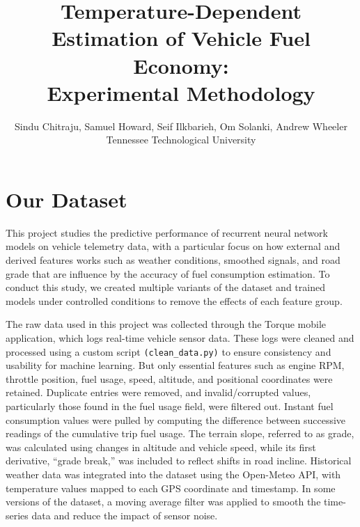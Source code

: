 \documentclass[letterpaper]{article}
\begin{document}

\nocopyright

\title{Temperature-Dependent Estimation of Vehicle Fuel Economy:\\Experimental Methodology}
\author{Sindu Chitraju, Samuel Howard, Seif Ilkbarieh, Om Solanki, Andrew Wheeler\\
Tennessee Technological University
}

\maketitle

\section*{Our Dataset}
This project studies the predictive performance of recurrent neural network 
models on vehicle telemetry data, with a particular focus on how external 
and derived features works such as weather conditions, smoothed signals, 
and road grade that are influence by the accuracy of fuel consumption 
estimation. To conduct this study, we created multiple variants of the 
dataset and trained models under controlled conditions to remove the 
effects of each feature group.

The raw data used in this project was collected through the Torque mobile 
application, which logs real-time vehicle sensor data. These logs were 
cleaned and processed using a custom script \verb|(clean_data.py)| to ensure 
consistency and usability for machine learning. But only essential 
features such as engine RPM, throttle position, fuel usage, speed, 
altitude, and positional coordinates were retained. Duplicate entries were 
removed, and invalid/corrupted values, particularly those found in the fuel 
usage field, were filtered out. Instant fuel consumption values were pulled 
by computing the difference between successive readings of the cumulative 
trip fuel usage. The terrain slope, referred to as grade, was calculated 
using changes in altitude and vehicle speed, while its first derivative, 
``grade break,'' was included to reflect shifts in road incline. 
Historical weather data was integrated into the dataset using the 
Open-Meteo API, with temperature values mapped to each GPS coordinate 
and timestamp. In some versions of the dataset, a moving average filter 
was applied to smooth the time-series data and reduce the impact of sensor 
noise.
\end{document}

